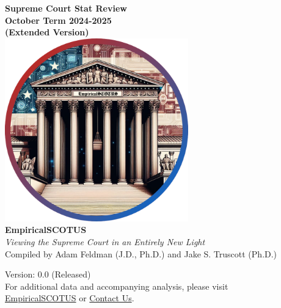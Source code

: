 
\thispagestyle{empty}
\begin{center}
  \Huge \textbf{Supreme Court Stat Review} \\
  \LARGE \textbf{October Term 2024-2025} \\
  \Large \textbf{(Extended Version)} \\ [7mm]
  \includegraphics[width=300px]{../images/empirical_scotus_logo.png}\\[2mm]
  \textbf{EmpiricalSCOTUS} \\
  \textit{Viewing the Supreme Court in an Entirely New Light} \\[3mm]

  \normalsize
  Compiled by Adam Feldman (J.D., Ph.D.) and Jake S. Truscott (Ph.D.) \\
  \vfill

  \footnotesize
  Version: 0.0 (Released) \\[2mm]

  \normalsize
 For additional data and accompanying analysis, please visit\\ \textcolor{blue}{\href{https://empiricalscotus.com/}{EmpiricalSCOTUS}} or \textcolor{blue}{\href{mailto:adam@feldmannet.com}{Contact Us}}.
\end{center}
